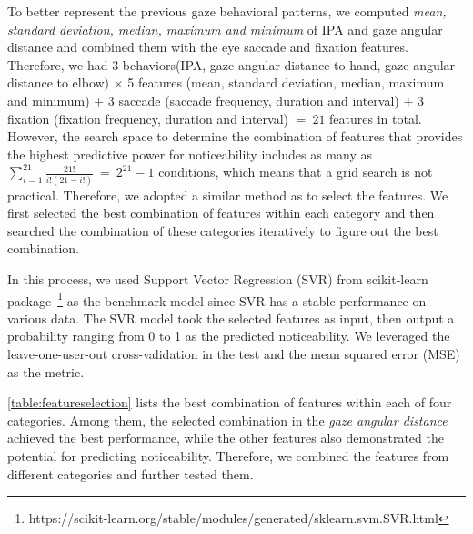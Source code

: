 To better represent the previous gaze behavioral patterns, we computed \textit{mean, standard deviation, median, maximum and minimum} of IPA and gaze angular distance and combined them with the eye saccade and fixation features.
Therefore, we had 3 behaviors(IPA, gaze angular distance to hand, gaze angular distance to elbow) $\times$ 5 features (mean, standard deviation, median, maximum and minimum) $+$ 3 saccade (saccade frequency, duration and interval) $+$ 3 fixation (fixation frequency, duration and interval) $=~21$ features in total.
However, the search space to determine the combination of features that provides the highest predictive power for noticeability includes as many as $\sum_{i=1}^{21}\frac{21!}{i!(21-i!)}~=~2^{21}-1$ conditions, which means that a grid search is not practical.
Therefore, we adopted a similar method as \cite{maslych2023effective} to select the features.
We first selected the best combination of features within each category and then searched the combination of these categories iteratively to figure out the best combination.

In this process, we used Support Vector Regression (SVR) from scikit-learn package~\footnote{https://scikit-learn.org/stable/modules/generated/sklearn.svm.SVR.html} as the benchmark model since SVR has a stable performance on various data.
The SVR model took the selected features as input, then output a probability ranging from 0 to 1 as the predicted noticeability.
We leveraged the leave-one-user-out cross-validation in the test and the mean squared error (MSE) as the metric.

\autoref{table:featureselection} lists the best combination of features within each of four categories.
Among them, the selected combination in the \textit{gaze angular distance} achieved the best performance, while the other features also demonstrated the potential for predicting noticeability.
Therefore, we combined the features from different categories and further tested them.

